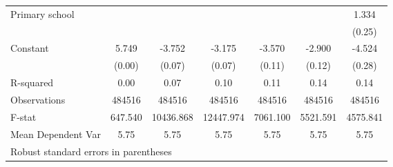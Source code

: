 {\begin{tabular}{l*{6}{c}}
Primary school      &                     &                     &                     &                     &                     &       1.334\sym{***}\\
                    &                     &                     &                     &                     &                     &      (0.25)         \\
Constant            &       5.749\sym{***}&      -3.752\sym{***}&      -3.175\sym{***}&      -3.570\sym{***}&      -2.900\sym{***}&      -4.524\sym{***}\\
                    &      (0.00)         &      (0.07)         &      (0.07)         &      (0.11)         &      (0.12)         &      (0.28)         \\
\hline
R-squared           &        0.00         &        0.07         &        0.10         &        0.11         &        0.14         &        0.14         \\
Observations        &      484516         &      484516         &      484516         &      484516         &      484516         &      484516         \\
F-stat              &     647.540         &   10436.868         &   12447.974         &    7061.100         &    5521.591         &    4575.841         \\
Mean Dependent Var  &        5.75         &        5.75         &        5.75         &        5.75         &        5.75         &        5.75         \\
\hline\hline
\multicolumn{7}{l}{\footnotesize Robust standard errors in parentheses}\\
\end{tabular}
}
